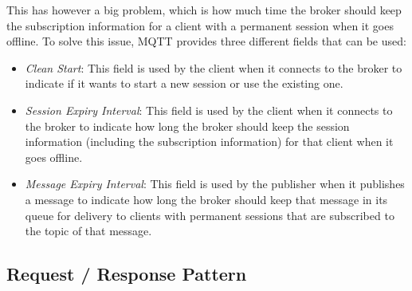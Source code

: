 This has however a big problem, which is how much time the broker should keep the subscription information for a client with a permanent session when it goes offline. To solve this issue, MQTT provides three different fields that can be used:
\begin{itemize}
    \item \emph{Clean Start}: This field is used by the client when it connects to the broker to indicate if it wants to start a new session or use the existing one.
    \item \emph{Session Expiry Interval}: This field is used by the client when it connects to the broker to indicate how long the broker should keep the session information (including the subscription information) for that client when it goes offline.
    \item \emph{Message Expiry Interval}: This field is used by the publisher when it publishes a message to indicate how long the broker should keep that message in its queue for delivery to clients with permanent sessions that are subscribed to the topic of that message.
\end{itemize}



\subsection{Request / Response Pattern}

